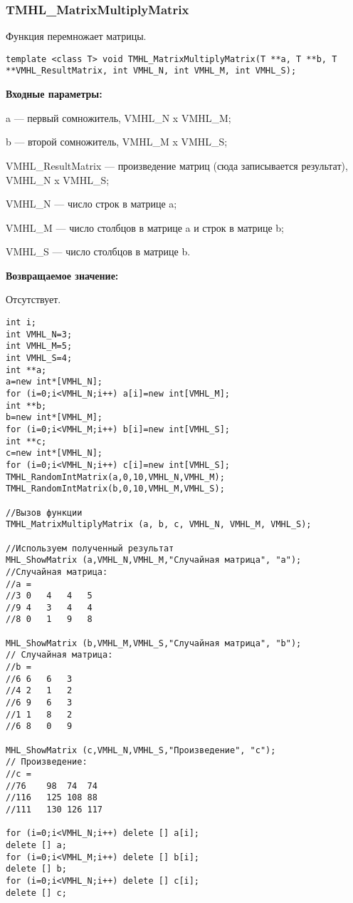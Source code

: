 \documentclass[a4paper,12pt]{article}
\begin{document}
\subsubsection{TMHL\_MatrixMultiplyMatrix}\label{TMHL_MatrixMultiplyMatrix}

Функция перемножает матрицы.


\begin{lstlisting}[label=code_syntax_TMHL_MatrixMultiplyMatrix,caption=Синтаксис]
template <class T> void TMHL_MatrixMultiplyMatrix(T **a, T **b, T **VMHL_ResultMatrix, int VMHL_N, int VMHL_M, int VMHL_S);
\end{lstlisting}

\textbf{Входные параметры:}

a --- первый сомножитель, VMHL\_N x VMHL\_M;
 
b --- второй сомножитель, VMHL\_M x VMHL\_S;
 
VMHL\_ResultMatrix --- произведение матриц (сюда записывается результат), VMHL\_N x VMHL\_S;
 
VMHL\_N --- число строк в матрице a;
 
VMHL\_M --- число столбцов в матрице a и строк в матрице b;
 
VMHL\_S --- число столбцов в матрице b.

\textbf{Возвращаемое значение:}

Отсутствует.


\begin{lstlisting}[label=code_use_TMHL_MatrixMultiplyMatrix,caption=Пример использования]
int i;
int VMHL_N=3;
int VMHL_M=5;
int VMHL_S=4;
int **a;
a=new int*[VMHL_N];
for (i=0;i<VMHL_N;i++) a[i]=new int[VMHL_M];
int **b;
b=new int*[VMHL_M];
for (i=0;i<VMHL_M;i++) b[i]=new int[VMHL_S];
int **c;
c=new int*[VMHL_N];
for (i=0;i<VMHL_N;i++) c[i]=new int[VMHL_S];
TMHL_RandomIntMatrix(a,0,10,VMHL_N,VMHL_M);
TMHL_RandomIntMatrix(b,0,10,VMHL_M,VMHL_S);

//Вызов функции
TMHL_MatrixMultiplyMatrix (a, b, c, VMHL_N, VMHL_M, VMHL_S);

//Используем полученный результат
MHL_ShowMatrix (a,VMHL_N,VMHL_M,"Случайная матрица", "a");
//Случайная матрица:
//a =
//3	0	4	4	5
//9	4	3	4	4
//8	0	1	9	8

MHL_ShowMatrix (b,VMHL_M,VMHL_S,"Случайная матрица", "b");
// Случайная матрица:
//b =
//6	6	6	3
//4	2	1	2
//6	9	6	3
//1	1	8	2
//6	8	0	9

MHL_ShowMatrix (c,VMHL_N,VMHL_S,"Произведение", "c");
// Произведение:
//c =
//76	98	74	74
//116	125	108	88
//111	130	126	117

for (i=0;i<VMHL_N;i++) delete [] a[i];
delete [] a;
for (i=0;i<VMHL_M;i++) delete [] b[i];
delete [] b;
for (i=0;i<VMHL_N;i++) delete [] c[i];
delete [] c;
\end{lstlisting}
\end{document}
